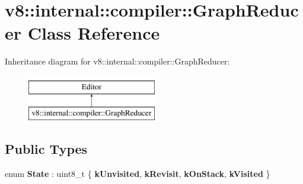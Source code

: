 \hypertarget{classv8_1_1internal_1_1compiler_1_1GraphReducer}{}\section{v8\+:\+:internal\+:\+:compiler\+:\+:Graph\+Reducer Class Reference}
\label{classv8_1_1internal_1_1compiler_1_1GraphReducer}
Inheritance diagram for v8\+:\+:internal\+:\+:compiler\+:\+:Graph\+Reducer\+:\begin{figure}[H]
\begin{center}
\leavevmode
\includegraphics[height=2.000000cm]{classv8_1_1internal_1_1compiler_1_1GraphReducer}
\end{center}
\end{figure}
\subsection*{Public Types}
\begin{DoxyCompactItemize}
\item 
\mbox{\label{classv8_1_1internal_1_1compiler_1_1GraphReducer_a78f7183b04d38293dfde6d60ceaa3d3e}} 
enum {\bfseries State} \+: uint8\+\_\+t \{ {\bfseries k\+Unvisited}, 
{\bfseries k\+Revisit}, 
{\bfseries k\+On\+Stack}, 
{\bfseries k\+Visited}
 \}
\end{DoxyCompactItemize}
